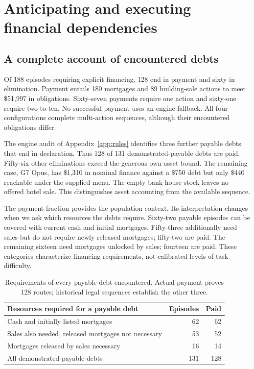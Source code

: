 \section{Anticipating and executing financial dependencies}
\label{sec:execution}

\subsection{A complete account of encountered debts}
Of 188 episodes requiring explicit financing, 128 end in payment and sixty in elimination. Payment entails 180 mortgages and 89 building-sale actions to meet \$51,997 in obligations. Sixty-seven payments require one action and sixty-one require two to ten. No successful payment uses an engine fallback. All four configurations complete multi-action sequences, although their encountered obligations differ.

The engine audit of Appendix~\ref{app:rules} identifies three further payable debts that end in declaration. Thus 128 of 131 demonstrated-payable debts are paid. Fifty-six other eliminations exceed the generous own-asset bound. The remaining case, G7 Opus, has \$1,310 in nominal finance against a \$750 debt but only \$440 reachable under the supplied menu. The empty bank house stock leaves no offered hotel sale. This distinguishes asset accounting from the available sequence.

The payment fraction provides the population context. Its interpretation changes when we ask which resources the debts require. Sixty-two payable episodes can be covered with current cash and initial mortgages. Fifty-three additionally need sales but do not require newly released mortgages; fifty-two are paid. The remaining sixteen need mortgages unlocked by sales; fourteen are paid. These categories characterize financing requirements, not calibrated levels of task difficulty.

\begin{table}[t]\centering\small
\begin{tabularx}{\linewidth}{@{}Yrr@{}}\toprule
Resources required for a payable debt & Episodes & Paid\\\midrule
Cash and initially listed mortgages &62&62\\
Sales also needed, released mortgages not necessary &53&52\\
Mortgages released by sales necessary &16&14\\\midrule
All demonstrated-payable debts &131&128\\\bottomrule
\end{tabularx}
\caption{Requirements of every payable debt encountered. Actual payment proves 128 routes; historical legal sequences establish the other three.}\label{tab:debt-requirements}
\end{table}

